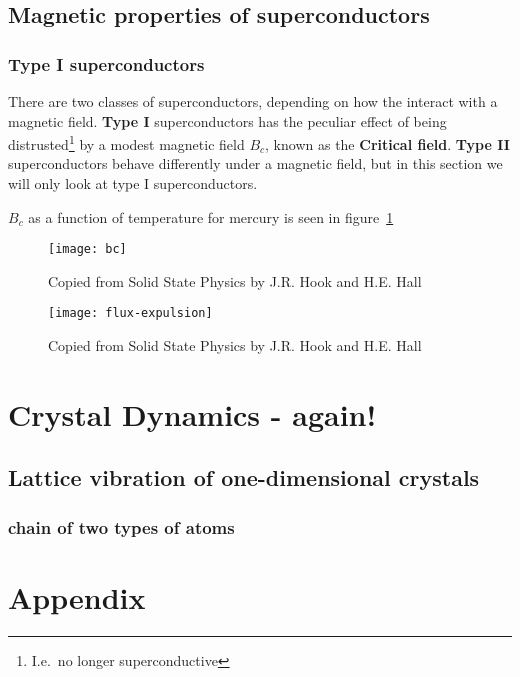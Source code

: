 \documentclass[11pt]{article}
\begin{document}
\subsection{Magnetic properties of superconductors}
\subsubsection{Type I superconductors}
There are two classes of superconductors, depending on how the interact with a magnetic field. \textbf{Type I} superconductors has the peculiar effect of being distrusted\footnote{I.e.\ no longer superconductive} by a  modest magnetic field $B_c$, known as the \textbf{Critical field}. \textbf{Type II} superconductors behave differently under a magnetic field, but in this section we will only look at type I superconductors.

$B_c$ as a function of temperature for mercury is seen in figure~\ref{fig:bc}
\begin{figure}[!ht]
	\centering
	\texttt{[image: bc]}
	\caption{Copied from Solid State Physics by J.R. Hook and H.E. Hall}
	\label{fig:bc}
\end{figure}
\begin{figure}[!ht]
	\centering
	\texttt{[image: flux-expulsion]}
	\caption{Copied from Solid State Physics by J.R. Hook and H.E. Hall}
	\label{fig:flux-expulsion}
\end{figure}


\section{Crystal Dynamics - again!}
\subsection{Lattice vibration of one-dimensional crystals}
\subsubsection{chain of two types of atoms}
\newpage
\clearpage
\appendix
\section{Appendix}
\end{document}
